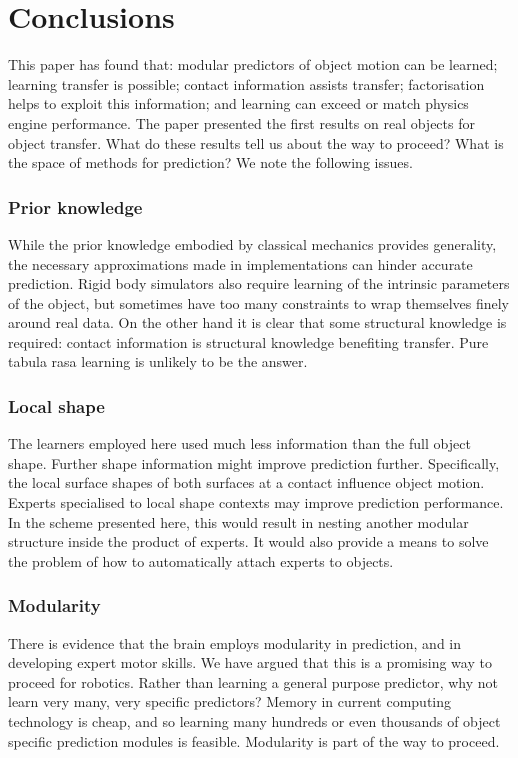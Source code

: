 
\section{Conclusions}\label{sec:Discussion}

This paper has found that: modular predictors of object motion can be learned; learning transfer is possible; contact information assists transfer; factorisation helps to exploit this information; and learning can exceed or match physics engine performance. The paper presented the first results on real objects for object transfer. What do these results tell us about the way to proceed? What is the space of methods for prediction? We note the following issues.

\subsubsection{ Prior knowledge} While the prior knowledge embodied by classical mechanics provides generality, the necessary approximations made in implementations can hinder accurate prediction. Rigid body simulators also require learning of the intrinsic parameters of the object, but sometimes have too many constraints to wrap themselves finely around real data. On the other hand it is clear that some structural knowledge is required: contact information is structural knowledge benefiting transfer. Pure tabula rasa learning is unlikely to be the answer.

\subsubsection{ Local shape} The learners employed here used much less information than the full object shape. Further shape information might improve prediction further. Specifically, the local surface shapes of both surfaces at a contact influence object motion. Experts specialised to local shape contexts may improve prediction performance. In the scheme presented here, this would result in nesting another modular structure inside the product of experts. It would also provide a means to solve the problem of how to automatically attach experts to objects.

\subsubsection{ Modularity} There is evidence that the brain employs modularity in prediction, and in developing expert motor skills. We have argued that this is a promising way to proceed for robotics. Rather than learning a general purpose predictor, why not learn very many, very specific predictors? Memory in current computing technology is cheap, and so learning many hundreds or even thousands of object specific prediction modules is feasible. Modularity is part of the way to proceed.

